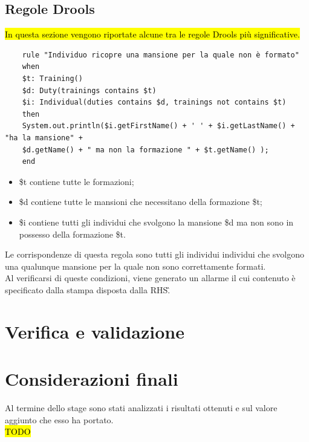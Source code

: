 \subsection{Regole Drools}
\label{Drools:regole}
\hl{In questa sezione vengono riportate alcune tra le regole Drools più significative.}
	\label{Drools:regolaMansioniFormazioni}
	\begin{verbatim}
	rule "Individuo ricopre una mansione per la quale non è formato"
	when
	$t: Training()
	$d: Duty(trainings contains $t)
	$i: Individual(duties contains $d, trainings not contains $t)
	then
	System.out.println($i.getFirstName() + ' ' + $i.getLastName() + "ha la mansione" +
	$d.getName() + " ma non la formazione " + $t.getName() );
	end
	\end{verbatim}
	\begin{itemize}
		\item \$t contiene tutte le formazioni;
		\item \$d contiene  tutte le mansioni che necessitano della formazione \$t;
		\item \$i contiene tutti gli individui che svolgono la mansione \$d ma non sono in possesso della formazione \$t.
	\end{itemize}
	Le corrispondenze di questa regola sono tutti gli individui individui che svolgono una qualunque mansione per la quale non sono correttamente formati.\\
	Al verificarsi di queste condizioni, viene generato un allarme il cui contenuto è specificato dalla stampa disposta dalla \gls{RHS}\G.
	



\newpage
\section{Verifica e validazione}
\newpage
\section{Considerazioni finali}
	Al termine dello stage sono stati analizzati i risultati ottenuti e sul valore aggiunto che esso ha portato.\\
	\hl{TODO }	

























